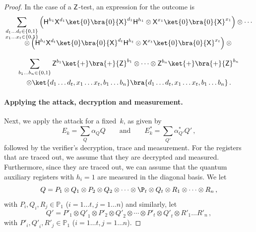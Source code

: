 \documentclass{toc}
\newcommand{\hgate}{{\sf H}}
\newcommand{\xgate}{{\sf X}}
\newcommand{\zgate}{{\sf Z}}
\newcommand{\ketbra}[2]{\ket{#1}\bra{#2}}			%
\newcommand{\egoketbra}[1]{\ketbra{#1}{#1}}			%
\begin{document}
\begin{proof}
In the case of a $\zgate$-test, an expression for the outcome is%
%
\begin{multline}
\label{eqn:z-test-end}
 \sum_{\substack{d_1 \ldots d_t \in \{0,1\}\\ x_1 \ldots x_t \in \{0,1\}}}
\left(\hgate^{h_1} \xgate^{d_1} \egoketbra{0} \xgate^{d_1} {\hgate}^{h_1} \otimes
  \xgate^{x_1} \egoketbra{0} \xgate^{x_1}\right) \otimes  \cdots  \\[-2ex]
   \otimes  \left(  \hgate^{h_t} \xgate^{d_t}  \egoketbra{0} \xgate^{d_t} {\hgate}^{h_t}  \otimes  \xgate^{x_t} \egoketbra{0} \xgate^{x_t}\right)
\otimes {}\\[2ex]\sum_{b_1 \ldots b_n \in \{0,1\}} \zgate^{b_1} \egoketbra{+} \zgate^{b_1} \otimes \cdots \otimes \zgate^{b_n} \egoketbra{+} \zgate^{b_n}\\
\otimes \egoketbra{d_1 \ldots d_t, x_1 \ldots x_t,b_1 \ldots b_n}\,.
\end{multline}


\paragraph{Applying the attack, decryption and measurement.} Next, we apply the attack for a fixed~$k$,  as given by
\begin{equation}
  E_k = \sum_Q \alpha_{Q} Q\qquad\text{and}\qquad E_k^* = \sum_{Q'} \alpha_{Q'}^* Q'\,,
\end{equation}
followed by the verifier's decryption, trace and measurement.  For the
registers that are traced out, we assume that they are decrypted and
measured. %
%
 Furthermore, since they are traced out, we can assume that
the quantum auxiliary registers with $h_i =1$ are measured in the
diagonal basis.  We let
\begin{equation}
  Q=P_1\otimes Q_1 \otimes P_2 \otimes Q_2 \otimes \cdots \otimes \P_t
  \otimes Q_t \otimes R_1 \otimes \cdots \otimes R_n\,,
\end{equation}
with $P_i, Q_i, R_j \in \mathbb{P}_1$ ($ i =1 \ldots t,j=1 \ldots n$)
and similarly, let
\begin{equation}
Q'={P'}_1\otimes {Q'}_1 \otimes {P'}_2 \otimes {Q'}_2 \otimes \cdots
\otimes {P'}_t \otimes {Q'}_t \otimes {R'}_1 \ldots {R'}_n\,,
\end{equation}
with ${P'}_i, {Q'}_i, {R'}_j \in \mathbb{P}_1$
($ i =1 \ldots t,j=1 \ldots n$).


\end{proof}
\end{document}
